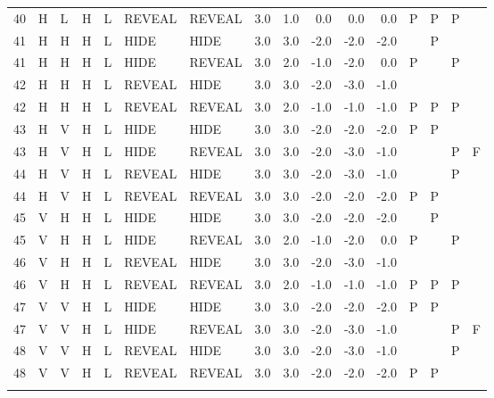\begin{longtable}{lllllllrrrrrllll}
  40 & H & L & H & L & REVEAL & REVEAL & 3.0 & 1.0 & 0.0 & 0.0 & 0.0 & P & P & P &  \\ 
  41 & H & H & H & L & HIDE & HIDE & 3.0 & 3.0 & -2.0 & -2.0 & -2.0 &  & P &  &  \\ 
  41 & H & H & H & L & HIDE & REVEAL & 3.0 & 2.0 & -1.0 & -2.0 & 0.0 & P &  & P &  \\ 
  42 & H & H & H & L & REVEAL & HIDE & 3.0 & 3.0 & -2.0 & -3.0 & -1.0 &  &  &  &  \\ 
  42 & H & H & H & L & REVEAL & REVEAL & 3.0 & 2.0 & -1.0 & -1.0 & -1.0 & P & P & P &  \\ 
  43 & H & V & H & L & HIDE & HIDE & 3.0 & 3.0 & -2.0 & -2.0 & -2.0 & P & P &  &  \\ 
  43 & H & V & H & L & HIDE & REVEAL & 3.0 & 3.0 & -2.0 & -3.0 & -1.0 &  &  & P & F \\ 
  44 & H & V & H & L & REVEAL & HIDE & 3.0 & 3.0 & -2.0 & -3.0 & -1.0 &  &  & P &  \\ 
  44 & H & V & H & L & REVEAL & REVEAL & 3.0 & 3.0 & -2.0 & -2.0 & -2.0 & P & P &  &  \\ 
  45 & V & H & H & L & HIDE & HIDE & 3.0 & 3.0 & -2.0 & -2.0 & -2.0 &  & P &  &  \\ 
  45 & V & H & H & L & HIDE & REVEAL & 3.0 & 2.0 & -1.0 & -2.0 & 0.0 & P &  & P &  \\ 
  46 & V & H & H & L & REVEAL & HIDE & 3.0 & 3.0 & -2.0 & -3.0 & -1.0 &  &  &  &  \\ 
  46 & V & H & H & L & REVEAL & REVEAL & 3.0 & 2.0 & -1.0 & -1.0 & -1.0 & P & P & P &  \\ 
  47 & V & V & H & L & HIDE & HIDE & 3.0 & 3.0 & -2.0 & -2.0 & -2.0 & P & P &  &  \\ 
  47 & V & V & H & L & HIDE & REVEAL & 3.0 & 3.0 & -2.0 & -3.0 & -1.0 &  &  & P & F \\ 
  48 & V & V & H & L & REVEAL & HIDE & 3.0 & 3.0 & -2.0 & -3.0 & -1.0 &  &  & P &  \\ 
  48 & V & V & H & L & REVEAL & REVEAL & 3.0 & 3.0 & -2.0 & -2.0 & -2.0 & P & P &  &  \\ 
   \hline
\hline
\label{truthtable}
\end{longtable}
\endgroup
